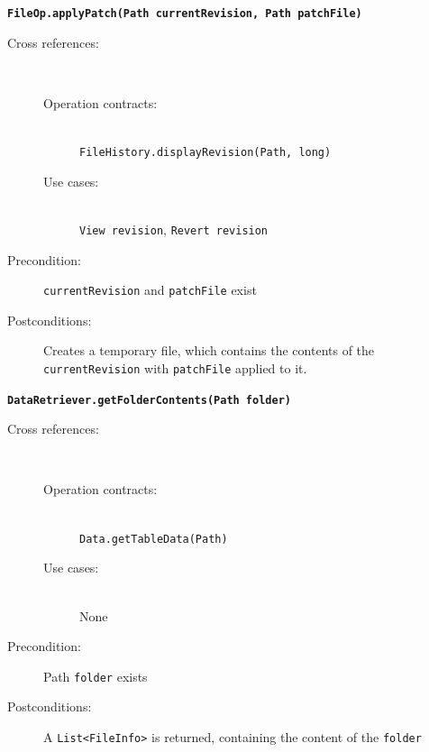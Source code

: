 \documentclass[12pt,a4paper]{article}
\begin{document}
\textbf{\texttt{FileOp.applyPatch(Path currentRevision, Path patchFile)}}
\begin{description}
	\item[Cross references:] \hfill \vspace{-4ex} \\
	\begin{description}
		\item[Operation contracts:] \hfill \\
			\texttt{FileHistory.displayRevision(Path, long)}
		\item[Use cases:] \hfill \\
			\texttt{View revision}, \texttt{Revert revision}
	\end{description}
	\item[Precondition:] \texttt{currentRevision} and \texttt{patchFile} exist
	\item[Postconditions:] Creates a temporary file, which contains the contents of the 		\texttt{currentRevision} with \texttt{patchFile} applied to it.
\end{description}

\vspace{0.75cm}

\textbf{\texttt{DataRetriever.getFolderContents(Path folder)}}
\begin{description}
	\item[Cross references:] \hfill \vspace{-4ex}  \\
	\begin{description} 
		\item[Operation contracts:] \hfill \\
			\texttt{Data.getTableData(Path)}
		\item[Use cases:] \hfill \\
			None
	\end{description}
	\item[Precondition:] Path \texttt{folder} exists
	\item[Postconditions:] A \texttt{List<FileInfo>} is returned, containing the content of the \texttt{folder}
\end{description}

\vspace{0.75cm}
\end{document}
